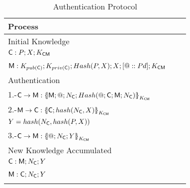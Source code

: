 \begin{table}[htb]
\footnotesize
\begin{center}
\caption{Authentication Protocol}
\label{table:AuthProtocol}
\begin{tabular}{|l|l|l|}
\hline
{\bf Process}                                                                     \\\hline\hline
            Initial Knowledge                                                     \\
            $\textsf{C}:P; X ; K_{\textsf{C}\textsf{M}}$                               \\
            \hspace{5mm}                                                 \\ 
            $\textsf{M}: K_{pub(\textsf{C})}; K_{priv(\textsf{C})}; Hash(P,X); X ;[@::Pd] ; K_{\textsf{C}\textsf{M}}$ \\\hline \hline
            Authentication                                                         \\
            1.-$\Client\rightarrow \Server: \fat{\Server \lnk @ \lnk N_{\Client} \lnk 
                                              Hash(@\lnk \Client \lnk \Server \lnk N_\Client)}_{K_{\Client\Server}}$  \\ 
            2.-$\Server\rightarrow \Client: \fat{\Client \lnk hash(N_{\Client},X)}_{K_{\Client\Server}}$ \\ 
            \hspace{5mm} $Y=hash(N_{\textsf{C}},hash(P,X))$                          \\              
            3.-$\Client\rightarrow \Server: \fat{@\lnk N_{\Client}\lnk Y}_{K_{\Client\Server}}$            \\ \hline  \hline
            New Knowledge Accumulated                                               \\
            $\textsf{C}: \textsf{M} ; N_{\textsf{C}} ; Y$         \\
            \hspace{5mm}                \\ 
            $\textsf{M}: \textsf{C}  ; N_{\textsf{C}} ; Y$          \\ 
            \hspace{5mm}                             \\ \hline \hline
\end{tabular}
\end{center}
\end{table}
\normalsize

